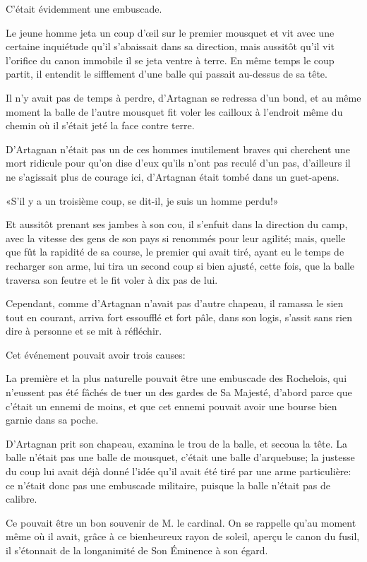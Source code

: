 C'était évidemment une embuscade. 

Le jeune homme jeta un coup d'œil sur le premier mousquet et vit avec une certaine inquiétude qu'il s'abaissait dans sa direction, mais aussitôt qu'il vit l'orifice du canon immobile il se jeta ventre à terre. En même temps le coup partit, il entendit le sifflement d'une balle qui passait au-dessus de sa tête. 

Il n'y avait pas de temps à perdre, d'Artagnan se redressa d'un bond, et au même moment la balle de l'autre mousquet fit voler les cailloux à l'endroit même du chemin où il s'était jeté la face contre terre. 

D'Artagnan n'était pas un de ces hommes inutilement braves qui cherchent une mort ridicule pour qu'on dise d'eux qu'ils n'ont pas reculé d'un pas, d'ailleurs il ne s'agissait plus de courage ici, d'Artagnan était tombé dans un guet-apens. 

«S'il y a un troisième coup, se dit-il, je suis un homme perdu!» 

Et aussitôt prenant ses jambes à son cou, il s'enfuit dans la direction du camp, avec la vitesse des gens de son pays si renommés pour leur agilité; mais, quelle que fût la rapidité de sa course, le premier qui avait tiré, ayant eu le temps de recharger son arme, lui tira un second coup si bien ajusté, cette fois, que la balle traversa son feutre et le fit voler à dix pas de lui. 

Cependant, comme d'Artagnan n'avait pas d'autre chapeau, il ramassa le sien tout en courant, arriva fort essoufflé et fort pâle, dans son logis, s'assit sans rien dire à personne et se mit à réfléchir. 

Cet événement pouvait avoir trois causes: 

La première et la plus naturelle pouvait être une embuscade des Rochelois, qui n'eussent pas été fâchés de tuer un des gardes de Sa Majesté, d'abord parce que c'était un ennemi de moins, et que cet ennemi pouvait avoir une bourse bien garnie dans sa poche. 

D'Artagnan prit son chapeau, examina le trou de la balle, et secoua la tête. La balle n'était pas une balle de mousquet, c'était une balle d'arquebuse; la justesse du coup lui avait déjà donné l'idée qu'il avait été tiré par une arme particulière: ce n'était donc pas une embuscade militaire, puisque la balle n'était pas de calibre. 

Ce pouvait être un bon souvenir de M. le cardinal. On se rappelle qu'au moment même où il avait, grâce à ce bienheureux rayon de soleil, aperçu le canon du fusil, il s'étonnait de la longanimité de Son Éminence à son égard. 

